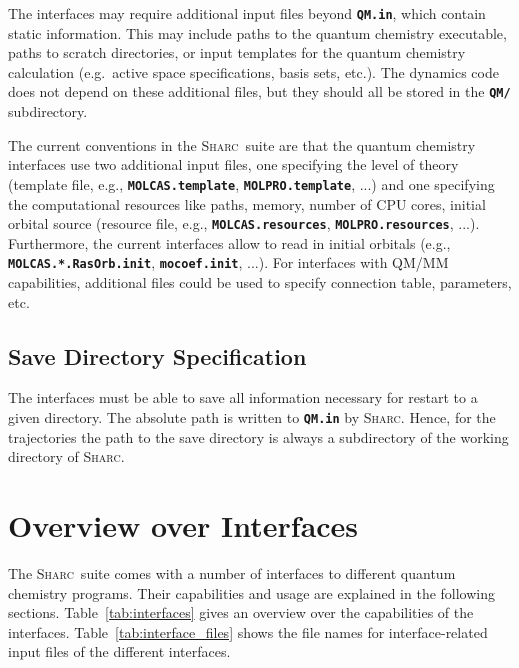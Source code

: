 \documentclass[a4paper,10pt,DIV=15,openany]{scrbook}
\newcommand{\sharc}{\textsc{Sharc}}
\newcommand{\ttt}[1]{\textbf{\texttt{#1}}}
\begin{document}
The interfaces may require additional input files beyond \ttt{QM.in}, which contain static information. This may include paths to the quantum chemistry executable, paths to scratch directories, or input templates for the quantum chemistry calculation (e.g.\ active space specifications, basis sets, etc.).
The dynamics code does not depend on these additional files, but they should all be stored in the \ttt{QM/} subdirectory.

The current conventions in the \sharc\ suite are that the quantum chemistry interfaces use two additional input files, one specifying the level of theory (template file, e.g., \ttt{MOLCAS.template}, \ttt{MOLPRO.template}, ...) and one specifying the computational resources like paths, memory, number of CPU cores, initial orbital source (resource file, e.g., \ttt{MOLCAS.resources}, \ttt{MOLPRO.resources}, ...).
Furthermore, the current interfaces allow to read in initial orbitals (e.g., \ttt{MOLCAS.*.RasOrb.init}, \ttt{mocoef.init}, ...).
For interfaces with QM/MM capabilities, additional files could be used to specify connection table, parameters, etc.



\subsection{Save Directory Specification}

The interfaces must be able to save all information necessary for restart to a given directory. The absolute path is written to \ttt{QM.in} by \sharc. Hence, for the trajectories the path to the save directory is always a subdirectory of the working directory of \sharc.



\clearpage
\section{Overview over Interfaces}\label{sec:int:overview}

The \sharc\ suite comes with a number of interfaces to different quantum chemistry programs.
Their capabilities and usage are explained in the following sections.
Table~\ref{tab:interfaces} gives an overview over the capabilities of the interfaces.
Table~\ref{tab:interface_files} shows the file names for interface-related input files of the different interfaces.
\end{document}
